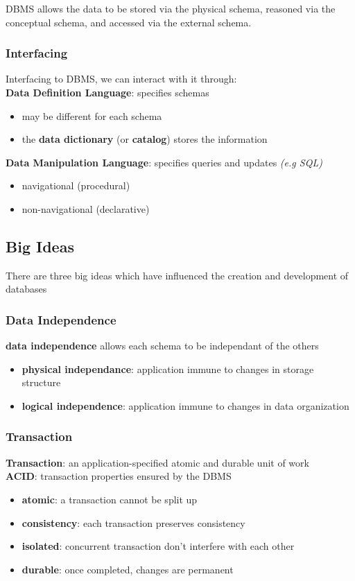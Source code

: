 \documentclass[]{article}
\theoremstyle{definition}
\begin{document}
				DBMS allows the data to be stored via the physical schema, reasoned via the conceptual schema, and accessed via the external schema.
	
			\subsubsection{Interfacing}
				Interfacing to DBMS, we can interact with it through: \\
				\textbf{Data Definition Language}: specifies schemas 
				\begin{itemize}
					\item may be different for each schema 
					\item the \textbf{data dictionary} (or \textbf{catalog}) stores the information
				\end{itemize}				

				\textbf{Data Manipulation Language}: specifies queries and updates \emph{(e.g SQL)}
				\begin{itemize}
					\item navigational (procedural)
					\item non-navigational (declarative)
				\end{itemize}								
		\subsection{Big Ideas}
			There are three big ideas which have influenced the creation and development of databases
			\subsubsection{Data Independence}
				\textbf{data independence} allows each schema to be independant of the
	others
				\begin{itemize}
					\item \textbf{physical independance}: application immune to changes
	in storage structure
					\item \textbf{logical independence}: application immune to changes in data organization
				\end{itemize}
			\subsubsection{Transaction}
				\textbf{Transaction}: an application-specified atomic and durable unit of work \\
				\textbf{ACID}: transaction properties ensured by the DBMS
				\begin{itemize}
					\item \textbf{atomic}: a transaction cannot be split up 
					\item \textbf{consistency}: each transaction preserves consistency 
					\item \textbf{isolated}: concurrent transaction don't interfere with each other 
					\item \textbf{durable}: once completed, changes are permanent
				\end{itemize}
\end{document}
